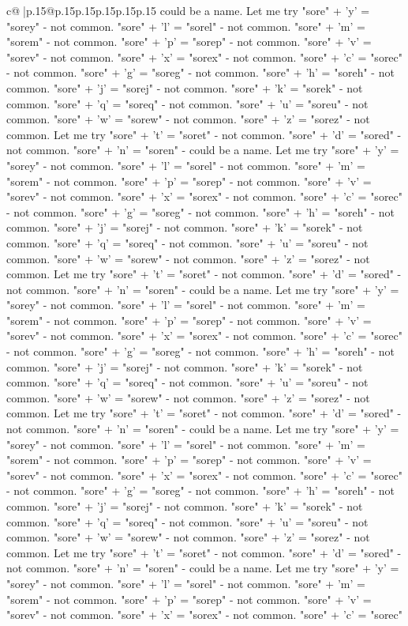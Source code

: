 \documentclass{article}
\begin{document}
{\begin{supertabular}{c@{$\;$}|p{.15\linewidth}@{}p{.15\linewidth}p{.15\linewidth}p{.15\linewidth}p{.15\linewidth}p{.15\linewidth}}
{{{could be a name. Let me try "sore" + 'y' = "sorey" {-} not common. "sore" + 'l' = "sorel" {-} not common. "sore" + 'm' = "sorem" {-} not common. "sore" + 'p' = "sorep" {-} not common. "sore" + 'v' = "sorev" {-} not common. "sore" + 'x' = "sorex" {-} not common. "sore" + 'c' = "sorec" {-} not common. "sore" + 'g' = "soreg" {-} not common. "sore" + 'h' = "soreh" {-} not common. "sore" + 'j' = "sorej" {-} not common. "sore" + 'k' = "sorek" {-} not common. "sore" + 'q' = "soreq" {-} not common. "sore" + 'u' = "soreu" {-} not common. "sore" + 'w' = "sorew" {-} not common. "sore" + 'z' = "sorez" {-} not common. Let me try "sore" + 't' = "soret" {-} not common. "sore" + 'd' = "sored" {-} not common. "sore" + 'n' = "soren" {-} could be a name. Let me try "sore" + 'y' = "sorey" {-} not common. "sore" + 'l' = "sorel" {-} not common. "sore" + 'm' = "sorem" {-} not common. "sore" + 'p' = "sorep" {-} not common. "sore" + 'v' = "sorev" {-} not common. "sore" + 'x' = "sorex" {-} not common. "sore" + 'c' = "sorec" {-} not common. "sore" + 'g' = "soreg" {-} not common. "sore" + 'h' = "soreh" {-} not common. "sore" + 'j' = "sorej" {-} not common. "sore" + 'k' = "sorek" {-} not common. "sore" + 'q' = "soreq" {-} not common. "sore" + 'u' = "soreu" {-} not common. "sore" + 'w' = "sorew" {-} not common. "sore" + 'z' = "sorez" {-} not common. Let me try "sore" + 't' = "soret" {-} not common. "sore" + 'd' = "sored" {-} not common. "sore" + 'n' = "soren" {-} could be a name. Let me try "sore" + 'y' = "sorey" {-} not common. "sore" + 'l' = "sorel" {-} not common. "sore" + 'm' = "sorem" {-} not common. "sore" + 'p' = "sorep" {-} not common. "sore" + 'v' = "sorev" {-} not common. "sore" + 'x' = "sorex" {-} not common. "sore" + 'c' = "sorec" {-} not common. "sore" + 'g' = "soreg" {-} not common. "sore" + 'h' = "soreh" {-} not common. "sore" + 'j' = "sorej" {-} not common. "sore" + 'k' = "sorek" {-} not common. "sore" + 'q' = "soreq" {-} not common. "sore" + 'u' = "soreu" {-} not common. "sore" + 'w' = "sorew" {-} not common. "sore" + 'z' = "sorez" {-} not common. Let me try "sore" + 't' = "soret" {-} not common. "sore" + 'd' = "sored" {-} not common. "sore" + 'n' = "soren" {-} could be a name. Let me try "sore" + 'y' = "sorey" {-} not common. "sore" + 'l' = "sorel" {-} not common. "sore" + 'm' = "sorem" {-} not common. "sore" + 'p' = "sorep" {-} not common. "sore" + 'v' = "sorev" {-} not common. "sore" + 'x' = "sorex" {-} not common. "sore" + 'c' = "sorec" {-} not common. "sore" + 'g' = "soreg" {-} not common. "sore" + 'h' = "soreh" {-} not common. "sore" + 'j' = "sorej" {-} not common. "sore" + 'k' = "sorek" {-} not common. "sore" + 'q' = "soreq" {-} not common. "sore" + 'u' = "soreu" {-} not common. "sore" + 'w' = "sorew" {-} not common. "sore" + 'z' = "sorez" {-} not common. Let me try "sore" + 't' = "soret" {-} not common. "sore" + 'd' = "sored" {-} not common. "sore" + 'n' = "soren" {-} could be a name. Let me try "sore" + 'y' = "sorey" {-} not common. "sore" + 'l' = "sorel" {-} not common. "sore" + 'm' = "sorem" {-} not common. "sore" + 'p' = "sorep" {-} not common. "sore" + 'v' = "sorev" {-} not common. "sore" + 'x' = "sorex" {-} not common. "sore" + 'c' = "sorec" }}}
\end{supertabular}}
\end{document}
